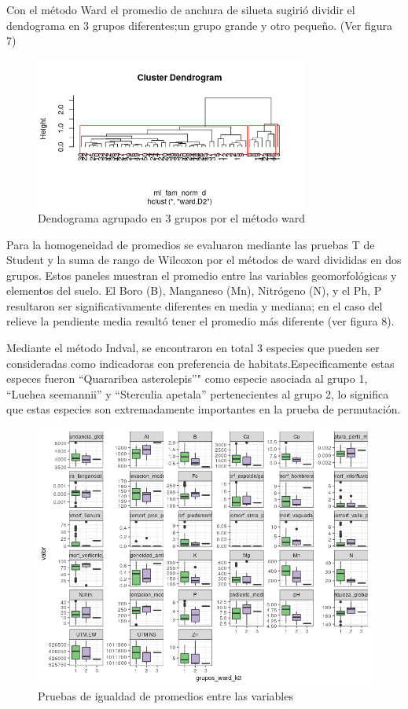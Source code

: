 \documentclass[11pt,]{article}
\begin{document}
Con el método Ward el promedio de anchura de silueta sugirió dividir el
dendograma en 3 grupos diferentes;un grupo grande y otro pequeño. (Ver
figura 7)

\begin{figure}
\centering
\includegraphics[width=0.80000\textwidth]{cluster_ward.png}
\caption{Dendograma agrupado en 3 grupos por el método ward}
\end{figure}

Para la homogeneidad de promedios se evaluaron mediante las pruebas T de
Student y la suma de rango de Wilcoxon por el métodos de ward divididas
en dos grupos. Estos paneles muestran el promedio entre las variables
geomorfológicas y elementos del suelo. El Boro (B), Manganeso (Mn),
Nitrógeno (N), y el Ph, P resultaron ser significativamente diferentes
en media y mediana; en el caso del relieve la pendiente media resultó
tener el promedio más diferente (ver figura 8).

Mediante el método Indval, se encontraron en total 3 especies que pueden
ser consideradas como indicadoras con preferencia de
habitats.Especificamente estas especes fueron ``Quararibea
asterolepis''" como especie asociada al grupo 1, ``Luehea seemannii'' y
``Sterculia apetala'' pertenecientes al grupo 2, lo significa que estas
especies son extremadamente importantes en la prueba de permutación.

\begin{figure}
\centering
\includegraphics[width=1.00000\textwidth]{variables_ambientales.png}
\caption{Pruebas de igualdad de promedios entre las variables}
\end{figure}
\end{document}
